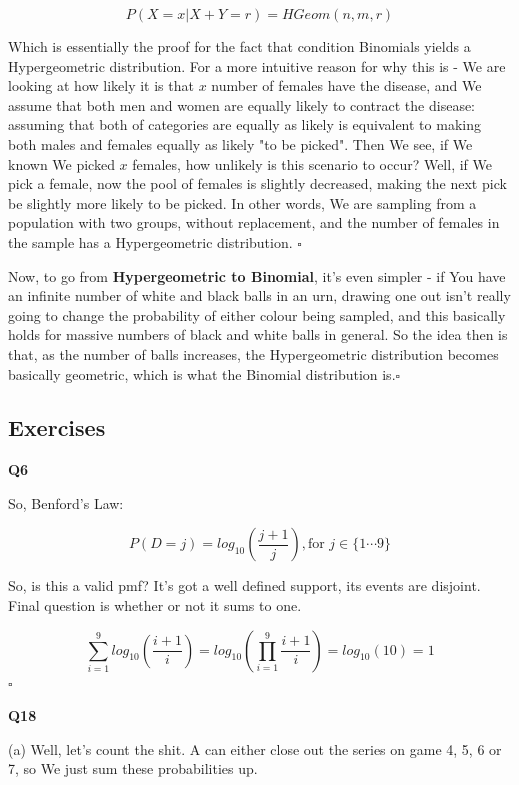 \documentclass{article}
\newcommand{\qed}{\hfill$\square$}
\begin{document}
		$$P(X = x \vert X + Y = r) = HGeom(n, m, r)$$
		
		Which is essentially the proof for the fact that condition Binomials yields a Hypergeometric distribution. For a more intuitive reason for why this is - We are looking at how likely it is that $x$ number of females have the disease, and We assume that both men and women are equally likely to contract the disease: assuming that both of categories are equally as likely is equivalent to making both males and females equally as likely "to be picked". Then We see, if We known We picked $x$ females, how unlikely is this scenario to occur? Well, if We pick a female, now the pool of females is slightly decreased, making the next pick be slightly more likely to be picked. In other words, We are sampling from a population with two groups, without replacement, and the number of females in the sample has a Hypergeometric distribution. \qed
		
		Now, to go from \textbf{Hypergeometric to Binomial}, it's even simpler - if You have an infinite number of white and black balls in an urn, drawing one out isn't really going to change the probability of either colour being sampled, and this basically holds for massive numbers of black and white balls in general. So the idea then is that, as the number of balls increases, the Hypergeometric distribution becomes basically geometric, which is what the Binomial distribution is.\qed
		
	\subsection{Exercises}
	
		\textbf{Q6}
			
			So, Benford's Law:
			
			$$P(D = j) = log_{10}\left( \frac{j+1}{j} \right), \text{for } j\in \{1\cdots 9\}$$
			
			So, is this a valid pmf? It's got a well defined support, its events are disjoint. Final question is whether or not it sums to one.
			
			$$\sum^9_{i=1} log_{10}\left( \frac{i+1}{i}\right) = log_{10}\left(\prod^9_{i=1}\frac{i+1}{i} \right) = log_{10}\left(10 \right) = 1$$ \qed
			
			\hfill
			
		\textbf{Q18}
			
			(a) Well, let's count the shit. A can either close out the series on game 4, 5, 6 or 7, so We just sum these probabilities up.
			
\end{document}
